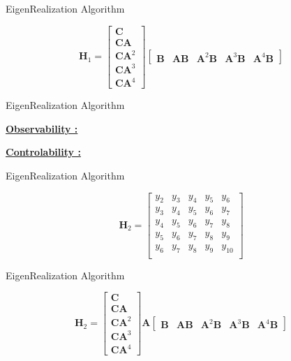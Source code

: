 \documentclass[aspectratio=169, usenames, dvipsnames]{beamer}
\begin{document}
\begin{frame}{EigenRealization Algorithm}
  \vfill

  \Large
  \[
  \bm{H}_1
  =
  \begin{bmatrix}
    \bm{C} \\ \bm{CA} \\ \bm{CA}^2 \\ \bm{CA}^3 \\ \bm{CA}^4
  \end{bmatrix}
  \begin{bmatrix}
    \bm{B} & \bm{AB} & \bm{A}^2 \bm{B} & \bm{A}^3 \bm{B} & \bm{A}^4 \bm{B}
  \end{bmatrix}
  \]

  \vfill
\end{frame}

\begin{frame}{EigenRealization Algorithm}
  \vfill

  \centering

  \underline{\textbf{Observability :}} 

  \vfill

  \underline{\textbf{Controlability :}} 

  \vfill
\end{frame}

\begin{frame}{EigenRealization Algorithm}
  \vfill

  \Large
  \[
  \bm{H}_2
  =
  \begin{bmatrix}
    y_2 & y_3 & y_4 & y_5 & y_6 \\
    y_3 & y_4 & y_5 & y_6 & y_7 \\
    y_4 & y_5 & y_6 & y_7 & y_8 \\
    y_5 & y_6 & y_7 & y_8 & y_9 \\
    y_6 & y_7 & y_8 & y_9 & y_{10} \\
  \end{bmatrix}
  \]

  \vfill
\end{frame}


\begin{frame}{EigenRealization Algorithm}
  \vfill

  \Large
  \[
  \bm{H}_2
  =
  \begin{bmatrix}
    \bm{C} \\ \bm{CA} \\ \bm{CA}^2 \\ \bm{CA}^3 \\ \bm{CA}^4
  \end{bmatrix}
  \bm{A}
  \begin{bmatrix}
    \bm{B} & \bm{AB} & \bm{A}^2 \bm{B} & \bm{A}^3 \bm{B} & \bm{A}^4 \bm{B}
  \end{bmatrix}
  \]

  \vfill
\end{frame}
\end{document}

